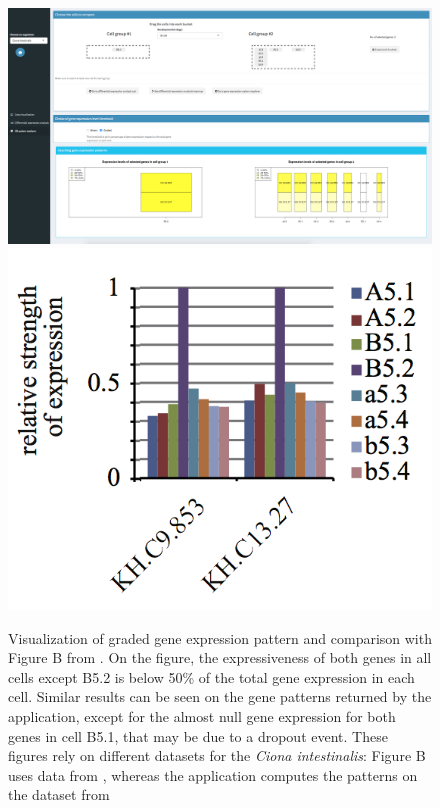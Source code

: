 \documentclass{report}
\begin{document}
{\begin{figure}[H]
\centering
\subfigure\includegraphics[scale=0.2]{application/gradedthres.png}
\subfigure\includegraphics[scale=0.5]{application/figureDchordate.png}
\caption{Visualization of graded gene expression pattern and comparison with Figure B from \cite{matsuoka2013transcriptome}. On the figure, the expressiveness of both genes in all cells except B5.2 is below 50\% of the total gene expression in each cell. Similar results can be seen on the gene patterns returned by the application, except for the almost null gene expression for both genes in cell B5.1, that may be due to a dropout event. These figures rely on different datasets for the \emph{Ciona intestinalis}: Figure B uses data from \cite{matsuoka2013transcriptome}, whereas the application computes the patterns on the dataset from \cite{suyama2016singlecell}}
\label{graded}
\end{figure}

}
\end{document}
